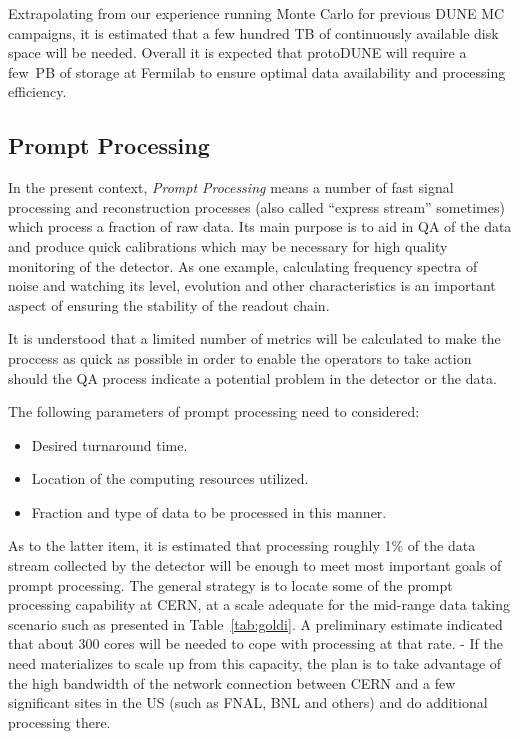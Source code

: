 Extrapolating from our experience running Monte Carlo for previous DUNE MC campaigns,
it is estimated that  a few hundred TB of continuously available disk space will be needed. Overall it is expected that protoDUNE will require
a few~PB of storage at Fermilab to ensure optimal data availability and  processing efficiency. 

\subsection{Prompt Processing}
\label{sec:prompt_processing}
In the present context, \textit{Prompt Processing} means a number of fast signal processing and reconstruction processes
(also called ``express stream'' sometimes) which process a fraction of raw data. Its main purpose is to aid in QA of the data
and produce quick calibrations which may be necessary for high quality monitoring of the detector. As one example,
calculating frequency spectra of noise and watching its level, evolution and other characteristics is an important aspect of ensuring
the stability of the readout chain.

It is understood
that a limited number of metrics will be calculated to make the proccess as quick as possible in order to enable
the operators to take action should the QA process indicate a potential problem in the detector or the data.

The following parameters of prompt processing need to considered:
\begin{itemize}
\item Desired turnaround time.
\item Location of the computing resources utilized.
\item Fraction and type of data to be processed in this manner.
\end{itemize}

\noindent As to the latter item, it is estimated that processing roughly 1\% of the data stream collected by the detector will
be enough to meet most important goals of prompt processing. 
The general strategy is to locate some of the prompt processing capability at CERN, at a scale adequate for the mid-range
data taking scenario such as presented in Table\, \ref{tab:goldi}. A preliminary estimate indicated that about 300 cores
will be needed to cope with processing at that rate.
-
If the need materializes to scale up from this capacity, 
the plan is to take advantage of the high bandwidth of the network connection between
CERN and a few significant sites in the US (such as FNAL, BNL and others) and do additional processing there.




